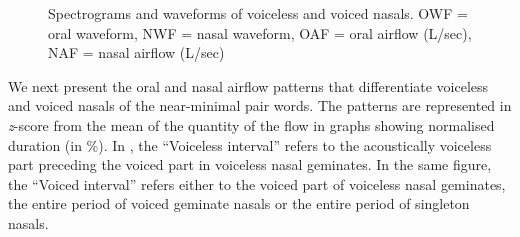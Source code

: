 \documentclass[output=paper]{langscibook}
\begin{document}
\begin{figure}
\caption{\label{fig:shinohara:3}Spectrograms and waveforms of voiceless and voiced nasals. OWF = oral waveform, NWF = nasal waveform, OAF = oral airflow (L/sec), NAF = nasal airflow (L/sec)}
\end{figure}

\newpage
We next present the oral and nasal airflow patterns that differentiate voiceless and voiced nasals of the near-minimal pair words. The patterns are represented in \textit{z}-score from the mean of the quantity of the flow in graphs showing normalised duration (in \%). In , the “Voiceless interval” refers to the acoustically voiceless part preceding the voiced part in voiceless nasal geminates. In the same figure, the “Voiced interval” refers either to the voiced part of voiceless nasal geminates, the entire period of voiced geminate nasals or the entire period of singleton nasals.
\end{document}
